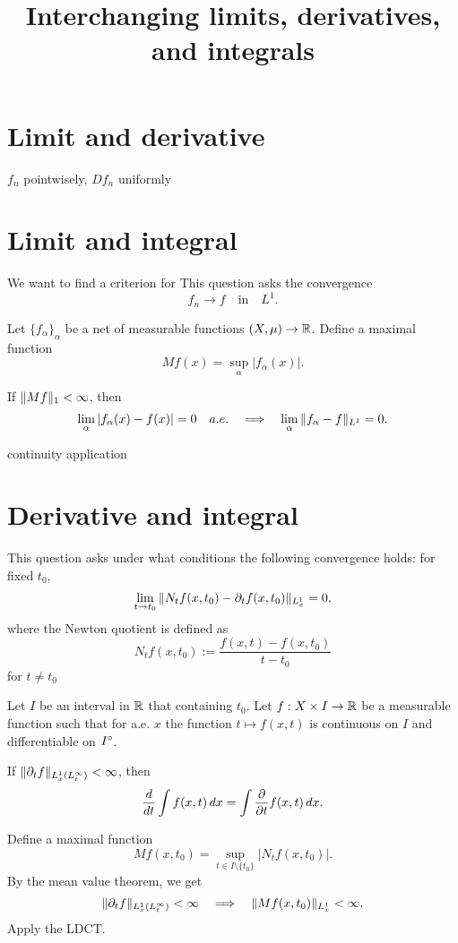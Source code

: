 \documentclass{../exp}
\title{Interchanging limits, derivatives, and integrals}
\begin{document}
\maketitle

\section{Limit and derivative}

$f_n$ pointwisely, $Df_n$ uniformly








\section{Limit and integral}
We want to find a criterion for 
This question asks the convergence
\[f_n\to f\quad\text{in}\quad L^1.\]

\begin{thm}
Let $\{f_\alpha\}_\alpha$ be a net of measurable functions $(X,\mu)\to\R$.
Define a maximal function
\[Mf(x)=\sup_\alpha|f_\alpha(x)|.\]

If $\|Mf\|_1<\infty$, then
\[\lim_\alpha|f_\alpha(x)-f(x)|=0\quad a.e.\impl\lim_\alpha\|f_\alpha-f\|_{L^1}=0.\]
\end{thm}

continuity application








\section{Derivative and integral}
This question asks under what conditions the following convergence holds: for fixed $t_0$,
\[\lim_{t\to t_0}\|N_tf(x,t_0)-\pd_tf(x,t_0)\|_{L_x^1}=0,\]
where the Newton quotient is defined as
\[N_tf(x,t_0):=\frac{f(x,t)-f(x,t_0)}{t-t_0}\]
for $t\ne t_0$

\begin{thm}
Let $I$ be an interval in $\mathbb{R}$ that containing $t_0$.
Let $f:X\x I\to\R$ be a measurable function such that for a.e. $x$ the function $t\mapsto f(x,t)$ is continuous on $I$ and differentiable on $I^\circ$.

If $\|\pd_tf\|_{L_x^1(L_t^\oo)}<\oo$, then
\[\dd{t}\int f(x,t)\,dx=\int\pd{t}f(x,t)\,dx.\]
\end{thm}
\begin{pf}
Define a maximal function
\[Mf(x,t_0)=\sup_{t\in I\setminus\{t_0\}}|N_tf(x,t_0)|.\]
By the mean value theorem, we get
\[\|\pd_tf\|_{L_x^1(L_t^\oo)}<\oo\impl\|Mf(x,t_0)\|_{L_x^1}<\oo.\]
Apply the LDCT.
\end{pf}
\end{document}
